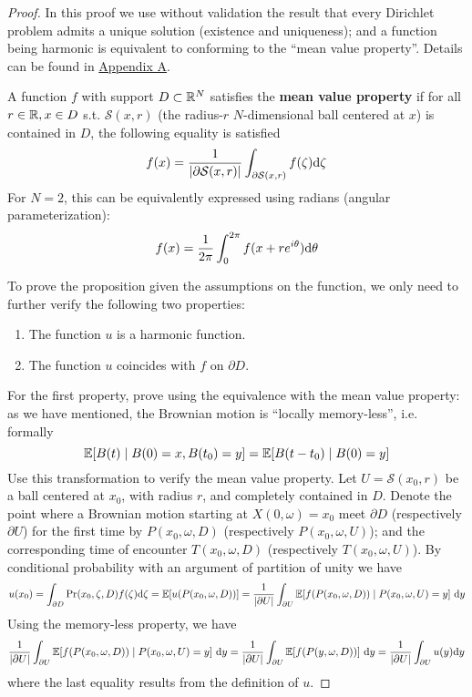 \documentclass[10pt]{article}
\begin{document}
\begin{proof}
    In this proof we use without validation the result that every Dirichlet problem admits a unique solution (existence and uniqueness); and a function being harmonic is equivalent to conforming to the ``mean value property''. Details can be found in \hyperref[appendix A]{Appendix A}.

    \begin{paraindent}
        \begin{definition}\label{def: mean value property}
            A function $f$ with support $D \subset \mathbb{R}^N$ satisfies the \textbf{mean value property} if for all $r \in \mathbb{R}, x \in D$ s.t. $\mathcal{S}(x, r)$ (the radius-$r$ $N$-dimensional ball centered at $x$) is contained in $D$, the following equality is satisfied
            \[
                f(x) = \frac{1}{\left|\partial \mathcal{S}(x, r)\right|}\int_{\partial \mathcal{S}(x, r)} f(\zeta) \mathrm{d} \zeta
            \]
            For $N = 2$, this can be equivalently expressed using radians (angular parameterization):
            \[
                f(x) = \frac{1}{2 \pi} \int_0^{2\pi} f(x + r e^{i \theta}) \mathrm{d} \theta 
            \]
        \end{definition}
    \end{paraindent}

    To prove the proposition given the assumptions on the function, we only need to further verify the following two properties:
    \begin{enumerate}
        \item The function $u$ is a harmonic function.
        \item The function $u$ coincides with $f$ on $\partial D$.
    \end{enumerate}

    For the first property, prove using the equivalence with the mean value property: as we have mentioned, the Brownian motion is ``locally memory-less'', i.e. formally
    \[
        \mathbb{E}[B(t) \mid B(0) = x, B(t_0) = y] = \mathbb{E}[B(t - t_0) \mid B(0) = y]
    \]
    Use this transformation to verify the mean value property. Let $U = \mathcal{S}(x_0, r)$ be a ball centered at $x_0$, with radius $r$, and completely contained in $D$. Denote the point where a Brownian motion starting at $X(0, \omega) = x_0$ meet $\partial D$ (respectively $\partial U$) for the first time by $P(x_0, \omega, D)$ (respectively $P(x_0, \omega, U)$); and the corresponding time of encounter $T(x_0, \omega, D)$ (respectively $T(x_0, \omega, U)$). By conditional probability with an argument of partition of unity we have
    \[
        u(x_0) = \int_{\partial D} \mathrm{Pr}(x_0, \zeta, D) f(\zeta) \mathrm{d} \zeta = \mathbb{E}[u(P(x_0, \omega, D))] = \frac{1}{\left|\partial U\right|} \int_{\partial U} \mathbb{E}[f(P(x_0, \omega, D)) \mid P(x_0, \omega, U) = y]\ \mathrm{d} y
    \]
    Using the memory-less property, we have
    \[
        \frac{1}{\left|\partial U\right|} \int_{\partial U} \mathbb{E}[f(P(x_0, \omega, D)) \mid P(x_0, \omega, U) = y]\ \mathrm{d} y = \frac{1}{\left|\partial U\right|} \int_{\partial U} \mathbb{E}[ f(P(y, \omega, D)) ]\ \mathrm{d} y = \frac{1}{\left|\partial U\right|} \int_{\partial U} u(y) \mathrm{d} y
    \]
    where the last equality results from the definition of $u$. 


\end{proof}
\end{document}
